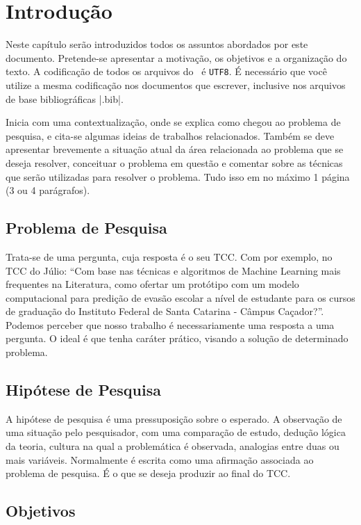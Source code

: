 \chapter{Introdução}
\label{chap:introducao}

Neste capítulo serão introduzidos todos os assuntos abordados por este documento. Pretende-se apresentar a motivação, os objetivos e a organização do texto. A codificação de todos os arquivos do \abnTeX\ é \texttt{UTF8}. É necessário que você utilize a mesma codificação nos documentos que escrever, inclusive nos arquivos de base bibliográficas |.bib|.

Inicia com uma contextualização, onde se explica como chegou ao problema de pesquisa, e cita-se algumas ideias de trabalhos relacionados. Também se deve apresentar brevemente a situação atual da área 
relacionada ao problema que se deseja resolver, conceituar o problema em questão e comentar sobre as técnicas que serão utilizadas para resolver o problema. Tudo isso em no máximo 1 página (3 ou 4 parágrafos).

\section{Problema de Pesquisa}
\label{sec:problema}

Trata-se de uma pergunta, cuja resposta é o seu TCC. Com por exemplo, no TCC do Júlio: “Com base nas técnicas e algoritmos de Machine Learning mais frequentes na Literatura, como ofertar um protótipo com 
um modelo computacional para predição de evasão escolar a nível de estudante para os cursos de graduação do Instituto Federal de Santa Catarina - Câmpus Caçador?”. Podemos perceber que nosso trabalho é necessariamente uma resposta a uma pergunta. O ideal é que tenha caráter prático, visando a solução de determinado problema.

\section{Hipótese de Pesquisa}
\label{sec:hipotese}

A hipótese de pesquisa é uma pressuposição sobre o esperado. A observação de uma situação pelo pesquisador, com uma comparação de estudo, dedução lógica da teoria, cultura na qual a problemática é observada, analogias entre duas ou mais variáveis. Normalmente é escrita como uma afirmação associada ao problema de pesquisa. É o que se deseja produzir ao final do TCC.

\section{Objetivos}
\label{sec:objetivos}

